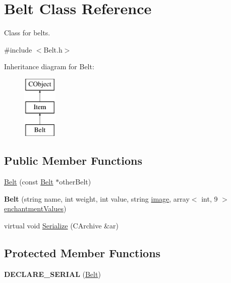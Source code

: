 \hypertarget{class_belt}{}\section{Belt Class Reference}
\label{class_belt}


Class for belts.  




{\ttfamily \#include $<$Belt.\+h$>$}

Inheritance diagram for Belt\+:\begin{figure}[H]
\begin{center}
\leavevmode
\includegraphics[height=3.000000cm]{class_belt}
\end{center}
\end{figure}
\subsection*{Public Member Functions}
\begin{DoxyCompactItemize}
\item 
\hyperlink{class_belt_a0fe7148ac3d4fba7953f89cd1ca00443}{Belt} (const \hyperlink{class_belt}{Belt} $\ast$other\+Belt)
\item 
\hypertarget{class_belt_a9a71355d55b90024c7d61888c25ff21d}{}\label{class_belt_a9a71355d55b90024c7d61888c25ff21d} 
{\bfseries Belt} (string name, int weight, int value, string \hyperlink{class_item_add84a42b692ee5d580a92ae4a922f784}{image}, array$<$ int, 9 $>$ \hyperlink{class_item_a8532d8729f9433f41b7fc18b20d83236}{enchantment\+Values})
\item 
virtual void \hyperlink{class_belt_a39c1f664a2f79f5dedac37546563f493}{Serialize} (C\+Archive \&ar)
\end{DoxyCompactItemize}
\subsection*{Protected Member Functions}
\begin{DoxyCompactItemize}
\item 
\hypertarget{class_belt_a989b953fb5cafb6a5ba4d5d96c83e43e}{}\label{class_belt_a989b953fb5cafb6a5ba4d5d96c83e43e} 
{\bfseries D\+E\+C\+L\+A\+R\+E\+\_\+\+S\+E\+R\+I\+AL} (\hyperlink{class_belt}{Belt})
\end{DoxyCompactItemize}
